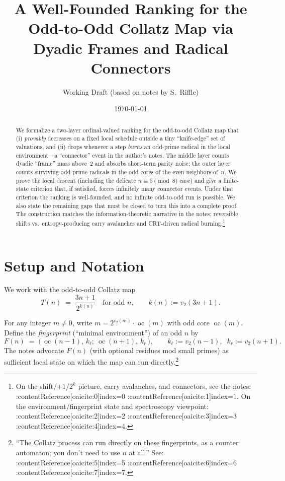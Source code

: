 \documentclass[11pt]{article}
\title{A Well-Founded Ranking for the Odd-to-Odd Collatz Map via Dyadic Frames and Radical Connectors}
\author{Working Draft (based on notes by S.~Riffle)}
\date{\today}
\newcommand{\vtwo}{v_{2}}
\newcommand{\oc}{\operatorname{oc}}
\begin{document}
\maketitle

\begin{abstract}
We formalize a two-layer ordinal-valued ranking for the odd-to-odd Collatz map that (i) \emph{provably} decreases on a fixed local schedule outside a tiny ``knife-edge'' set of valuations, and (ii) drops whenever a step \emph{burns} an odd-prime radical in the local environment---a ``connector'' event in the author's notes. The middle layer counts dyadic ``frame'' mass above~2 and absorbs short-term parity noise; the outer layer counts surviving odd-prime radicals in the odd cores of the even neighbors of~$n$. We prove the local descent (including the delicate $n\equiv5\pmod 8$ case) and give a finite-state criterion that, if satisfied, forces infinitely many connector events. Under that criterion the ranking is well-founded, and no infinite odd-to-odd run is possible. We also state the remaining gaps that must be closed to turn this into a complete proof. The construction matches the information-theoretic narrative in the notes: reversible shifts vs.\ entropy-producing carry avalanches and CRT-driven radical burning.\footnote{On the shift/$+1$/$2^k$ picture, carry avalanches, and connectors, see the notes: :contentReference[oaicite:0]{index=0} :contentReference[oaicite:1]{index=1}. On the environment/fingerprint state and spectroscopy viewpoint: :contentReference[oaicite:2]{index=2} :contentReference[oaicite:3]{index=3} :contentReference[oaicite:4]{index=4}.}
\end{abstract}

\section{Setup and Notation}


We work with the odd-to-odd Collatz map
\[
  T(n)\;=\;\frac{3n+1}{2^{k(n)}}\quad\text{for odd }n,\qquad k(n):=\vtwo(3n+1).
\]

For any integer $m\neq 0$, write $m=2^{\vtwo(m)}\cdot \oc(m)$ with odd core $\oc(m)$.
Define the \emph{fingerprint} (``minimal environment'') of an odd $n$ by
\[
  F(n)\;=\;\big(\,\oc(n-1),\,k_\ell;\ \oc(n+1),\,k_r\,\big),\qquad
  k_\ell:=\vtwo(n-1),\;\;k_r:=\vtwo(n+1).
\]
The notes advocate $F(n)$ (with optional residues mod small primes) as sufficient local
state on which the map can run directly.\footnote{``The Collatz process can run directly on these fingerprints, as a counter automaton; you don't need to use $n$ at all.'' See: :contentReference[oaicite:5]{index=5} :contentReference[oaicite:6]{index=6} :contentReference[oaicite:7]{index=7}.}
\end{document}
